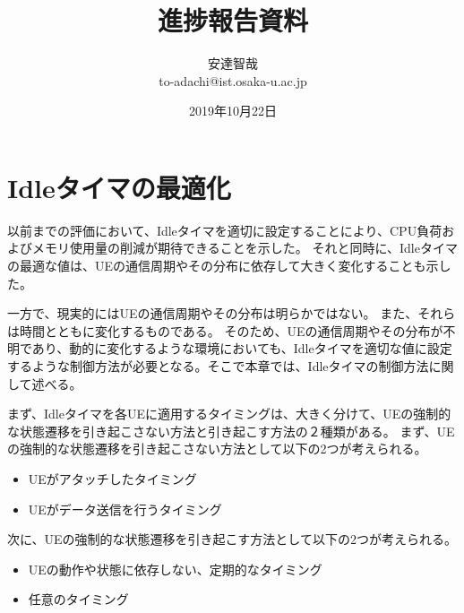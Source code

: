 \documentclass[a4j]{ujarticle}
\title{進捗報告資料}
\author{安達智哉\\to-adachi@ist.osaka-u.ac.jp}
\date{2019年10月22日}
\begin{document}
\maketitle



\section{Idleタイマの最適化}
以前までの評価において、Idleタイマを適切に設定することにより、CPU負荷およびメモリ使用量の削減が期待できることを示した。
それと同時に、Idleタイマの最適な値は、UEの通信周期やその分布に依存して大きく変化することも示した。

一方で、現実的にはUEの通信周期やその分布は明らかではない。
また、それらは時間とともに変化するものである。
そのため、UEの通信周期やその分布が不明であり、動的に変化するような環境においても、Idleタイマを適切な値に設定するような制御方法が必要となる。そこで本章では、Idleタイマの制御方法に関して述べる。

まず、Idleタイマを各UEに適用するタイミングは、大きく分けて、UEの強制的な状態遷移を引き起こさない方法と引き起こす方法の２種類がある。
まず、UEの強制的な状態遷移を引き起こさない方法として以下の2つが考えられる。
\begin{itemize}
  \item UEがアタッチしたタイミング
  \item UEがデータ送信を行うタイミング
\end{itemize}
次に、UEの強制的な状態遷移を引き起こす方法として以下の2つが考えられる。
\begin{itemize}
\item UEの動作や状態に依存しない、定期的なタイミング
\item 任意のタイミング
\end{itemize}
\end{document}
